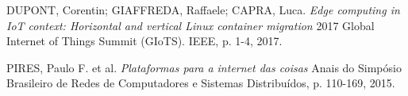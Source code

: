 \documentclass{sbrt}
\begin{document}
\begin{thebibliography}{99}
 DUPONT, Corentin; GIAFFREDA, Raffaele; CAPRA, Luca. \textit{Edge computing in IoT context: Horizontal and vertical Linux container migration} 
2017 Global Internet of Things Summit (GIoTS). IEEE, p. 1-4, 2017.

 PIRES, Paulo F. et al. \textit{Plataformas para a internet das coisas} Anais do Simpósio Brasileiro de Redes de Computadores e Sistemas Distribuídos, p. 110-169, 2015.

\end{thebibliography}

\end{document}
